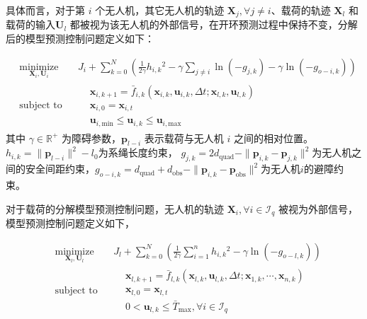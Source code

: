 \documentclass[lang=chs, degree=master, blindreview=true, winfonts=true]{yanputhesis}
\begin{document}
具体而言，对于第 $i$ 个无人机，其它无人机的轨迹 $ \bm X_j, \forall j \neq i$、载荷的轨迹 $\bm X_l$ 和 载荷的输入$\bm U_l$ 都被视为该无人机的外部信号，在开环预测过程中保持不变，分解后的模型预测控制问题定义如下：

\begin{equation}
	\begin{aligned} 
	&\operatorname*{minimize}_{\bm{X}_i, \bm{U}_i} & & J_i + \sum_{k=0}^{N} \left( \frac{1}{2\gamma} h_{i,k}{}^2 - \gamma \sum_{j \neq i} \ln(-g_{j,k}) -\gamma \ln(-g_{{o-i},k}) \right)\\
	&\text{subject to}& & \begin{aligned}
& \bm{x}_{i,{k+1}} = \bar{f}_{i,k}(\bm{x}_{i,k}, \bm{u}_{i,k}, \Delta t; \bm{x}_{l,k}, \bm{u}_{l,k}) \\
& \bm{x}_{i,0} = \bm{x}_{i,t}\\
& \bm{u}_{i,{\text{min}}} \leq \bm{u}_{i,k} \leq \bm{u}_{i,{\text{max}}}		\end{aligned}	
\end{aligned}
\label{multiuav}
\end{equation}
其中
$\gamma \in \mathbb{R}^+$ 为障碍参数，$\bm p_{l-i}$ 表示载荷与无人机 $i$ 之间的相对位置。
$h_{i,k} = \|\bm p_{l-i}\|^2 - l_0$为系绳长度约束，
$g_{j,k} = 2d_{\text{quad}} - \|\bm p_{i,k} - \bm p_{j,k}\|^2$为无人机之间的安全间距约束，$g_{{o-i},k} = d_{\text{quad}} + d_{\text{obs}} - \|\bm p_{i,k} - \bm p_{\text{obs}}\|^2$为无人机$i$的避障约束。

对于载荷的分解模型预测控制问题，无人机的轨迹 $\bm X_i, \forall i \in \mathcal{I}_q$ 被视为外部信号，模型预测控制问题定义如下，

\begin{equation}
	\begin{aligned} 
	&\operatorname*{minimize}_{\bm{X}_l, \bm{U}_l}& &  J_l + \sum_{k=0}^{N} \left( \frac{1}{2\gamma} \sum_{i=1}^{n} h_{i,k}{}^2 - \gamma \ln(-g_{{o-l},k}) \right)\\
	&\text{subject to}& & \begin{aligned}
& \bm{x}_{l,{k+1}} = \bar{f}_{l,k}(\bm{x}_{l,k}, \bm{u}_{l,k}, \Delta t; \bm{x}_{1,k}, \cdots, \bm{x}_{n,k}) \\
& \bm{x}_{l,0} = \bm{x}_{l,t}\\
& 0 < \bm{u}_{l,k} \leq \bar{T}_{\text{max}}, \forall i \in \mathcal{I}_q		\end{aligned}	
\end{aligned}
\label{multipayload}
\end{equation}
\end{document}

